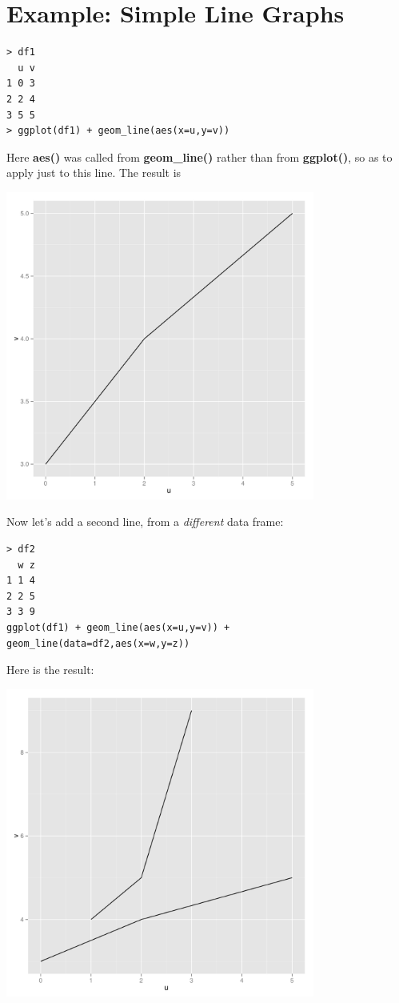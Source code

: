 \section{Example:  Simple Line Graphs}

\begin{lstlisting}
> df1
  u v
1 0 3
2 2 4
3 5 5
> ggplot(df1) + geom_line(aes(x=u,y=v))
\end{lstlisting}

Here {\bf aes()} was called from {\bf geom\_line()} rather than from
{\bf ggplot()}, so as to apply just to this line.  The result is

\includegraphics[width=4.0in]{Lines1.pdf}

Now let's add a second line, from a {\it different} data frame:

\begin{lstlisting}
> df2
  w z
1 1 4
2 2 5
3 3 9
ggplot(df1) + geom_line(aes(x=u,y=v)) + geom_line(data=df2,aes(x=w,y=z))
\end{lstlisting}

Here is the result:

\includegraphics[width=4.0in]{Lines2.pdf}

